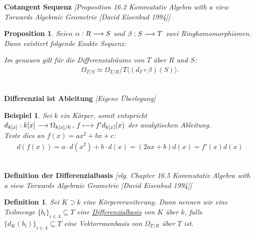 \documentclass[10pt,a4paper]{report}
\newcommand{\comment}[1]{}
\newcommand{\ModulsOfDifferenzials}{Kommutativ Algebra with a view Torwards Algebraic Geometrie [David Eisenbud 1994]}
\newcounter{Aussage}[chapter]
\newtheorem{prop}[Aussage]{Proposition}
\newtheorem{definition}[Aussage]{Definition}
\newtheorem{bsp}[Aussage]{Beispiel}
\newcommand{\functionfront}[3]{\nolinebreak{#1:#2 \longrightarrow #3}}
\newcommand{\function}[5]{\nolinebreak{#1:#2 \longrightarrow #3 \, , \, #4 \longmapsto #5}}
\newcommand{\divR}[2]{\Omega_{#1/#2}}
\newcommand{\divf}[1]{d_{#1}}
\newcommand{\Tensor}[3]{#1 \otimes_{#2} #3}
\newcommand{\tensor}[3]{#1 \otimes #3}
\begin{document}
\textbf{Cotangent Sequenz} \textit{[Proposition 16.2 \ModulsOfDifferenzials]}
\begin{prop}\label{Cotangent Sequenz}
Seien $\functionfront{\alpha}{R}{S}$ und $\functionfront{\beta}{S}{T}$ zwei Ringhomomorphismen. Dann existiert folgende Exakte Sequenz:
\begin{center}
\end{center}
Im genauen gilt für die Differenzialräume von $T$ über $R$ und $S$:
\begin{gather*}
\divR{T}{S} \simeq \divR{T}{R}/T \langle (\divf{T} \circ \beta)(S)\rangle.
\end{gather*}
\end{prop}


\ \\
\textbf{Differenzial ist Ableitung} \textit{[Eigene Überlegung]}
\begin{bsp}\comment{\label{Differenzial ist Ableitung}}
Sei $k$ ein Körper, somit entspricht $\function{\divf{k[x]}}{k[x]}{\divR{k[x]}{k}}{f}{f'\divf{k[x]}(x)}$ der analytischen Ableitung.\\
Teste dies an $f(x)=ax^2 + bx +c$:
\begin{gather*}
d(f(x)) = a \cdot d(x^2) + b \cdot d(x) = (2ax + b) d(x) = f'(x) d(x) 
\end{gather*}
\comment{lässt sich induktiv für Monome leicht zeigen}
\end{bsp}


\ \\
\textbf{Definition der Differenzialbasis} \textit{[vlg. Chapter 16.5 \ModulsOfDifferenzials]}
\begin{definition}\comment{\label{Definition der Differenzialbasis}}
Sei $K \supset k$ eine Körpererweiterung. Dann nennen wir eine Teilmenge $\lbrace b_i \rbrace_{i \in \Lambda} \subseteq T$ eine \underline{Differenzialbasis} von $K$ über $k$, falls $\lbrace \divf{K}(b_i)\rbrace_{i \in \Lambda} \subseteq T$ eine Vektorraumbasis von $\divR{T}{R}$ über $T$ ist.
\end{definition}
\end{document}
